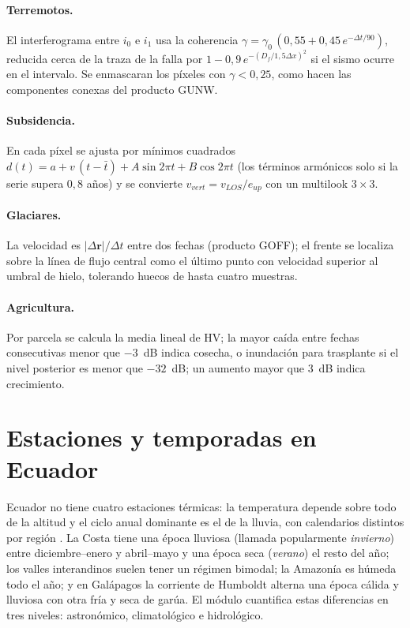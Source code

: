 \documentclass[11pt,a4paper]{article}
\newcommand{\vect}[1]{\mathbf{#1}}
\newcommand{\codigo}[1]{\cpcodigo{#1}}
\begin{document}
\paragraph{Terremotos.} El interferograma entre $i_0$ e $i_1$ usa la coherencia
$\gamma = \gamma_0\,(0{,}55 + 0{,}45\,e^{-\Delta t/90})$, reducida cerca de la traza de la falla por
$1 - 0{,}9\,e^{-(D_f/1{,}5\Delta x)^2}$ si el sismo ocurre en el intervalo. Se enmascaran los píxeles con
$\gamma<0{,}25$, como hacen las componentes conexas del producto GUNW.

\paragraph{Subsidencia.} En cada píxel se ajusta por mínimos cuadrados
$d(t) = a + v\,(t-\bar t) + A\sin 2\pi t + B\cos 2\pi t$ (los términos armónicos solo si la serie supera
$0{,}8$ años) y se convierte $v_{vert} = v_{LOS}/e_{up}$ con un multilook $3\times3$.

\paragraph{Glaciares.} La velocidad es $|\Delta\vect r|/\Delta t$ entre dos fechas (producto GOFF); el
frente se localiza sobre la línea de flujo central como el último punto con velocidad superior al umbral
de hielo, tolerando huecos de hasta cuatro muestras.

\paragraph{Agricultura.} Por parcela se calcula la media lineal de HV; la mayor caída entre fechas
consecutivas menor que $-3$~dB indica cosecha, o inundación para trasplante si el nivel posterior es
menor que $-32$~dB; un aumento mayor que $3$~dB indica crecimiento.

\section{Estaciones y temporadas en Ecuador}\label{sec:estaciones}

Ecuador no tiene cuatro estaciones térmicas: la temperatura depende sobre todo de la altitud y el ciclo
anual dominante es el de la lluvia, con calendarios distintos por región \cite{pourrut1995,vuille2000}.
La Costa tiene una época lluviosa (llamada popularmente \emph{invierno}) entre diciembre--enero y
abril--mayo y una época seca (\emph{verano}) el resto del año; los valles interandinos suelen tener un
régimen bimodal; la Amazonía es húmeda todo el año; y en Galápagos la corriente de Humboldt alterna una
época cálida y lluviosa con otra fría y seca de garúa. El módulo \codigo{modelo/estaciones.py} cuantifica estas
diferencias en tres niveles: astronómico, climatológico e hidrológico.
\end{document}
